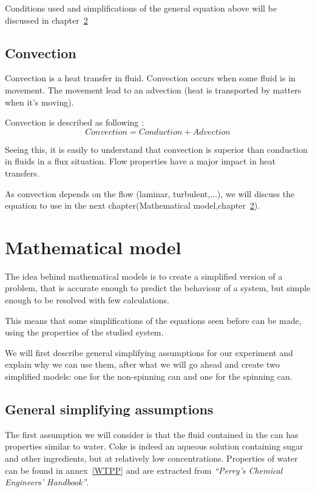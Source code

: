 \documentclass{report}
\begin{document}
	Conditions used and simplifications of the general equation above will be discussed in chapter~\ref{mm}
		
	\section{Convection}\label{cv}
	
	Convection is a heat transfer in fluid. Convection occurs when some fluid is in movement. The movement lead to an advection (heat is transported by matters when it's moving).
	
	Convection is described as following :
	\begin{equation}
		Convection = Conduction + Advection
	\end{equation}
	
	Seeing this, it is easily to understand that convection is superior than conduction in fluids in a flux situation. Flow properties have a major impact in heat transfers.
	
	As convection depends on the flow (laminar, turbulent,...), we will discuss the equation to use in the next chapter(Mathematical model,chapter~\ref{mm}).
	
	\chapter{Mathematical model}\label{mm}
	
	The idea behind mathematical models is to create a simplified version of a problem, that is accurate enough to predict the behaviour of a system, but simple enough to be resolved with few calculations.
	
	This means that some simplifications of the equations seen before can be made, using the properties of the studied system.
	
	We will first describe general simplifying assumptions for our experiment and explain why we can use them, after what we will go ahead and create two simplified models: one for the non-spinning can and one for the spinning can.
	
	\section{General simplifying assumptions}\label{gsa}
	
	The first assumption we will consider is that the fluid contained in the can has properties similar to water. Coke is indeed an aqueous solution containing sugar and other ingredients, but at relatively low concentrations.
	Properties of water can be found in annex~\ref{WTPP} and are extracted from \emph{``Perry’s Chemical Engineers’ Handbook''\cite{properties}}.
	
\end{document}
